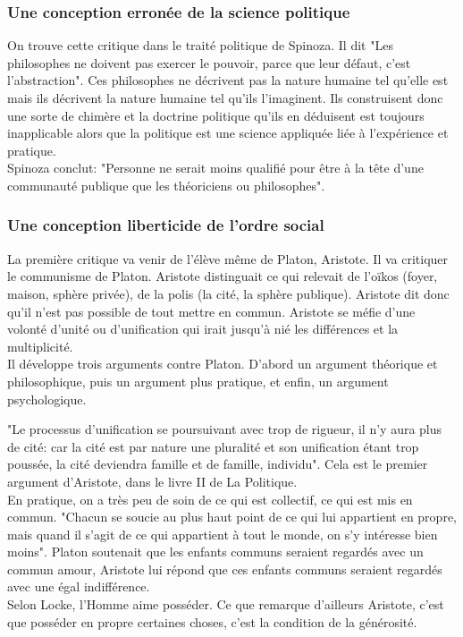 \documentclass[10pt, a4paper, openany]{book}
\begin{document}
\subsubsection{Une conception erronée de la science politique}

On trouve cette critique dans le traité politique de Spinoza. Il dit "Les philosophes ne doivent pas exercer le pouvoir, parce que leur défaut, c'est l'abstraction". Ces philosophes ne décrivent pas la nature humaine tel qu'elle est mais ils décrivent la nature humaine tel qu'ils l'imaginent. Ils construisent donc une sorte de chimère et la doctrine politique qu'ils en déduisent est toujours inapplicable alors que la politique est une science appliquée liée à l'expérience et pratique. \\
Spinoza conclut: "Personne ne serait moins qualifié pour être à la tête d'une communauté publique que les théoriciens ou philosophes".

\subsubsection{Une conception liberticide de l'ordre social}

La première critique va venir de l'élève même de Platon, Aristote. Il va critiquer le communisme de Platon. Aristote distinguait ce qui relevait de l'oïkos (foyer, maison, sphère privée), de la polis (la cité, la sphère publique). Aristote dit donc qu'il n'est pas possible de tout mettre en commun. Aristote se méfie d'une volonté d'unité ou d'unification qui irait jusqu'à nié les différences et la multiplicité. \\
Il développe trois arguments contre Platon. D'abord un argument théorique et philosophique, puis un argument plus pratique, et enfin, un argument psychologique. 


"Le processus d'unification se poursuivant avec trop de rigueur, il n'y aura plus de cité: car la cité est par nature une pluralité et son unification étant trop poussée, la cité deviendra famille et de famille, individu". Cela est le premier argument d'Aristote, dans le livre II de La Politique. \\
En pratique, on a très peu de soin de ce qui est collectif, ce qui est mis en commun. "Chacun se soucie au plus haut point de ce qui lui appartient en propre, mais quand il s'agit de ce qui appartient à tout le monde, on s'y intéresse bien moins". Platon soutenait que les enfants communs seraient regardés avec un commun amour, Aristote lui répond que ces enfants communs seraient regardés avec une égal indifférence. \\
Selon Locke, l'Homme aime posséder. Ce que remarque d'ailleurs Aristote, c'est que posséder en propre certaines choses, c'est la condition de la générosité. 
\end{document}
